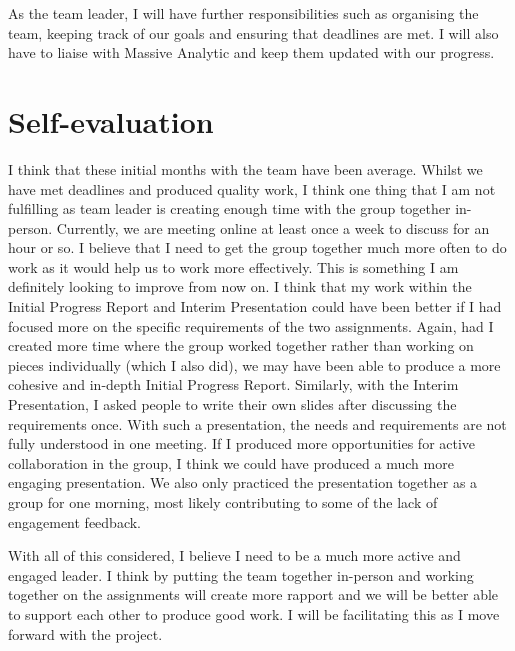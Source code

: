 \documentclass[11pt]{article}
\begin{document}
As the team leader, I will have further responsibilities such as organising the team, keeping track of our goals and ensuring that deadlines are met. I will also have to liaise with Massive Analytic and keep them updated with our progress.
\section{Self-evaluation}
I think that these initial months with the team have been average. Whilst we have met deadlines and produced quality work, I think one thing that I am not fulfilling as team leader is creating enough time with the group together in-person. Currently, we are meeting online at least once a week to discuss for an hour or so. I believe that I need to get the group together much more often to do work as it would help us to work more effectively. This is something I am definitely looking to improve from now on. I think that my work within the Initial Progress Report and Interim Presentation could have been better if I had focused more on the specific requirements of the two assignments. Again, had I created more time where the group worked together rather than working on pieces individually (which I also did), we may have been able to produce a more cohesive and in-depth Initial Progress Report. Similarly, with the Interim Presentation, I asked people to write their own slides after discussing the requirements once. With such a presentation, the needs and requirements are not fully understood in one meeting. If I produced more opportunities for active collaboration in the group, I think we could have produced a much more engaging presentation. We also only practiced the presentation together as a group for one morning, most likely contributing to some of the lack of engagement feedback.

With all of this considered, I believe I need to be a much more active and engaged leader. I think by putting the team together in-person and working together on the assignments will create more rapport and we will be better able to support each other to produce good work. I will be facilitating this as I move forward with the project.
\end{document}
